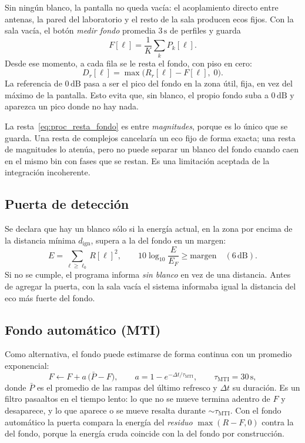 Sin ningún blanco, la pantalla no queda vacía: el acoplamiento directo entre
antenas, la pared del laboratorio y el resto de la sala producen ecos fijos.
Con la sala vacía, el botón \emph{medir fondo} promedia $3\,\text{s}$ de
perfiles y guarda
\begin{equation}
  F[\ell] = \frac{1}{K}\sum_{k} P_k[\ell].
\end{equation}
Desde ese momento, a cada fila se le resta el fondo, con piso en cero:
\begin{equation}
  D_r[\ell] = \max\bigl(R_r[\ell] - F[\ell],\; 0\bigr).
  \label{eq:proc_resta_fondo}
\end{equation}
La referencia de $0\,\text{dB}$ pasa a ser el pico del fondo en la zona útil,
fija, en vez del máximo de la pantalla. Esto evita que, sin blanco, el propio
fondo suba a $0\,\text{dB}$ y aparezca un pico donde no hay nada.

La resta~\eqref{eq:proc_resta_fondo} es entre \emph{magnitudes}, porque es
lo único que se guarda. Una resta de complejos cancelaría un eco fijo de
forma exacta; una resta de magnitudes lo atenúa, pero no puede separar un
blanco del fondo cuando caen en el mismo bin con fases que se restan. Es una
limitación aceptada de la integración incoherente.

\subsection{Puerta de detección}

Se declara que hay un blanco sólo si la energía actual, en la zona por
encima de la distancia mínima $d_\text{ign}$, supera a la del fondo en un
margen:
\begin{equation}
  E = \sum_{\ell \geq \ell_0} R[\ell]^2,
  \qquad
  10\log_{10}\frac{E}{E_F} \geq \text{margen}\quad (6\,\text{dB}).
\end{equation}
Si no se cumple, el programa informa \emph{sin blanco} en vez de una
distancia. Antes de agregar la puerta, con la sala vacía el sistema
informaba igual la distancia del eco más fuerte del fondo.

\subsection{Fondo automático (MTI)}

Como alternativa, el fondo puede estimarse de forma continua con un promedio
exponencial:
\begin{equation}
  F \leftarrow F + a\,\bigl(\bar P - F\bigr),
  \qquad a = 1 - e^{-\Delta t/\tau_\text{MTI}},
  \qquad \tau_\text{MTI} = 30\,\text{s},
\end{equation}
donde $\bar P$ es el promedio de las rampas del último refresco y $\Delta t$
su duración. Es un filtro pasaaltos en el tiempo lento: lo que no se mueve
termina adentro de $F$ y desaparece, y lo que aparece o se mueve resalta
durante $\sim\tau_\text{MTI}$. Con el fondo automático la puerta compara la
energía del \emph{residuo} $\max(R - F, 0)$ contra la del fondo, porque la
energía cruda coincide con la del fondo por construcción.

